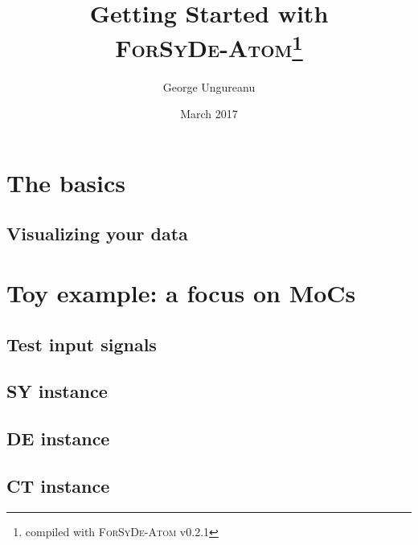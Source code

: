 \documentclass{article}
\title{Getting Started with \\\textsc{ForSyDe-Atom}\thanks{compiled with \textsc{ForSyDe-Atom} v0.2.1}}
\author{George Ungureanu}
\date{March 2017}
\begin{document}
\maketitle

\begin{abstract}

\end{abstract}



\newpage
\tableofcontents
\newpage



\section{The basics}
\label{sec:basic-usage}


\subsection{Visualizing your data}
\label{sec:visu-your-data}


\section{Toy example: a focus on MoCs}
\label{sec:toy-example}


\subsection{Test input signals}
\label{sec:test-signals}


\subsection{SY instance}
\label{sec:sy-instance}


\subsection{DE instance}
\label{sec:de-instance}


\subsection{CT instance}
\label{sec:ct-instance}

\end{document}
